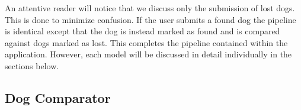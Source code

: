 \documentclass{article}
\begin{document}
An attentive reader will notice that we discuss only the submission of lost dogs.  This is done to minimize confusion.  If the user submits a found dog the pipeline is identical except that the dog is instead marked as found and is compared against dogs marked as lost.  This completes the pipeline contained within the application.  However, each model will be discussed in detail individually in the sections below.


\subsection{Dog Comparator}
\end{document}
